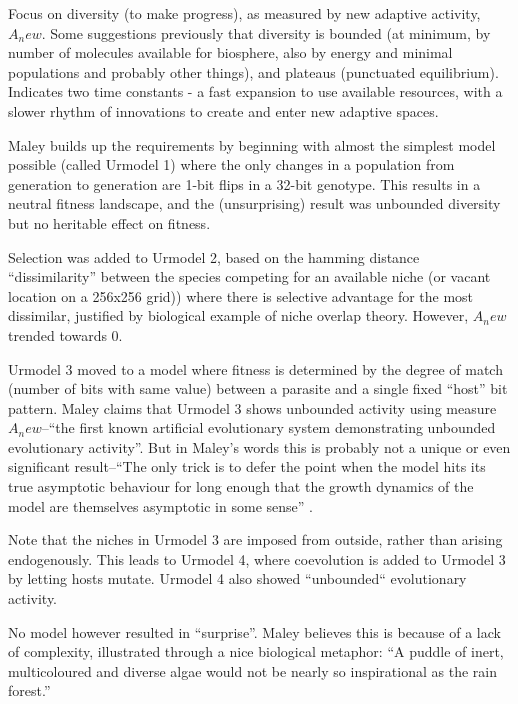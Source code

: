 \begin{NOTES}
\parencite{Maley1999}
Focus on diversity (to make progress), as measured by new adaptive activity, $A_new$. Some suggestions previously that diversity is bounded (at minimum, by number of molecules available for biosphere, also by energy and minimal populations and probably other things), and plateaus (punctuated equilibrium). Indicates two time constants - a fast expansion to use available resources, with a slower rhythm of innovations to create and enter new adaptive spaces.

Maley builds up the requirements by beginning with almost the simplest model possible (called Urmodel 1) where the only changes in a population from generation to generation are 1-bit flips in a 32-bit genotype. This results in a neutral fitness landscape, and the (unsurprising) result was unbounded diversity but no heritable effect on fitness.

Selection was added to Urmodel 2, based on the hamming distance ``dissimilarity'' between the species competing for an available niche (or vacant location on a 256x256 grid)) where there is selective advantage for the most dissimilar, justified by biological example of niche overlap theory. However, $A_new$ trended towards $0$.

Urmodel 3 moved to a model where fitness is determined by the degree of match (number of bits with same value) between a parasite and a single fixed ``host'' bit pattern. Maley claims that Urmodel 3 shows unbounded activity using measure $A_new$--``the first known artificial evolutionary system demonstrating unbounded evolutionary activity''. But in Maley's words this is probably not a unique or even significant result--``The only trick is to defer the point when the model hits its true asymptotic behaviour for long enough that the growth dynamics of the model are themselves asymptotic in some sense'' \parencite{Maley1999}.

Note that the niches in Urmodel 3 are imposed from outside, rather than arising endogenously. This leads to Urmodel 4, where coevolution is added to Urmodel 3 by letting hosts mutate. Urmodel 4 also showed ``unbounded`` evolutionary activity.

No model however resulted in ``surprise''. Maley believes this is because of a lack of complexity, illustrated through a nice biological metaphor: ``A puddle of inert, multicoloured and diverse algae would not be nearly so inspirational as the rain forest.''




\end{NOTES}

